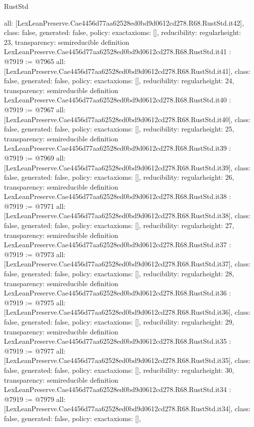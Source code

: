 \begin{lexlean}{RustStd}
\begin{coremodule}
{  all: [LexLeanPreserve.Cae4456d77aa62528ed0bd9d0612cd278.R68.RustStd.it42],
  class: false,
  generated: false,
  policy: exact{axioms: []},
  reducibility: regular{height: 23},
  transparency: semireducible
}
definition LexLeanPreserve.Cae4456d77aa62528ed0bd9d0612cd278.R68.RustStd.it41 : @7919 := @7965 {
  all: [LexLeanPreserve.Cae4456d77aa62528ed0bd9d0612cd278.R68.RustStd.it41],
  class: false,
  generated: false,
  policy: exact{axioms: []},
  reducibility: regular{height: 24},
  transparency: semireducible
}
definition LexLeanPreserve.Cae4456d77aa62528ed0bd9d0612cd278.R68.RustStd.it40 : @7919 := @7967 {
  all: [LexLeanPreserve.Cae4456d77aa62528ed0bd9d0612cd278.R68.RustStd.it40],
  class: false,
  generated: false,
  policy: exact{axioms: []},
  reducibility: regular{height: 25},
  transparency: semireducible
}
definition LexLeanPreserve.Cae4456d77aa62528ed0bd9d0612cd278.R68.RustStd.it39 : @7919 := @7969 {
  all: [LexLeanPreserve.Cae4456d77aa62528ed0bd9d0612cd278.R68.RustStd.it39],
  class: false,
  generated: false,
  policy: exact{axioms: []},
  reducibility: regular{height: 26},
  transparency: semireducible
}
definition LexLeanPreserve.Cae4456d77aa62528ed0bd9d0612cd278.R68.RustStd.it38 : @7919 := @7971 {
  all: [LexLeanPreserve.Cae4456d77aa62528ed0bd9d0612cd278.R68.RustStd.it38],
  class: false,
  generated: false,
  policy: exact{axioms: []},
  reducibility: regular{height: 27},
  transparency: semireducible
}
definition LexLeanPreserve.Cae4456d77aa62528ed0bd9d0612cd278.R68.RustStd.it37 : @7919 := @7973 {
  all: [LexLeanPreserve.Cae4456d77aa62528ed0bd9d0612cd278.R68.RustStd.it37],
  class: false,
  generated: false,
  policy: exact{axioms: []},
  reducibility: regular{height: 28},
  transparency: semireducible
}
definition LexLeanPreserve.Cae4456d77aa62528ed0bd9d0612cd278.R68.RustStd.it36 : @7919 := @7975 {
  all: [LexLeanPreserve.Cae4456d77aa62528ed0bd9d0612cd278.R68.RustStd.it36],
  class: false,
  generated: false,
  policy: exact{axioms: []},
  reducibility: regular{height: 29},
  transparency: semireducible
}
definition LexLeanPreserve.Cae4456d77aa62528ed0bd9d0612cd278.R68.RustStd.it35 : @7919 := @7977 {
  all: [LexLeanPreserve.Cae4456d77aa62528ed0bd9d0612cd278.R68.RustStd.it35],
  class: false,
  generated: false,
  policy: exact{axioms: []},
  reducibility: regular{height: 30},
  transparency: semireducible
}
definition LexLeanPreserve.Cae4456d77aa62528ed0bd9d0612cd278.R68.RustStd.it34 : @7919 := @7979 {
  all: [LexLeanPreserve.Cae4456d77aa62528ed0bd9d0612cd278.R68.RustStd.it34],
  class: false,
  generated: false,
  policy: exact{axioms: []},
}
\end{coremodule}
\end{lexlean}

